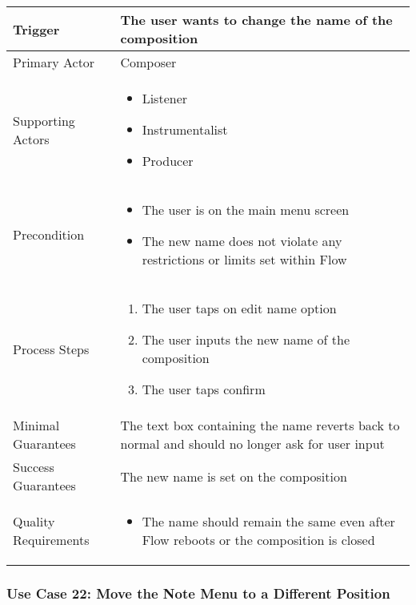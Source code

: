 \begin{tabularx}{\textwidth}{|X|X|}
\hline
Trigger & 
The user wants to change the name of the composition \\
\hline
Primary Actor & 
Composer \\
\hline
Supporting Actors & 
\begin{itemize}
\item Listener
\item Instrumentalist
\item Producer
\end{itemize} \\
\hline
Precondition & 
\begin{itemize}
\item The user is on the main menu screen
\item The new name does not violate any restrictions or limits set within Flow
\end{itemize} \\
\hline
Process Steps & 
\begin{enumerate}
\item The user taps on edit name option
\item The user inputs the new name of the composition
\item The user taps confirm
\end{enumerate} \\
\hline
Minimal Guarantees & 
The text box containing the name reverts back to normal and should no longer ask for user input \\
\hline
Success Guarantees & 
The new name is set on the composition \\
\hline
Quality Requirements & 
\begin{itemize}
\item The name should remain the same even after Flow reboots or the composition is closed
\end{itemize} \\ 
\hline
\end{tabularx}

\subsubsection{Use Case 22: Move the Note Menu to a Different Position}

